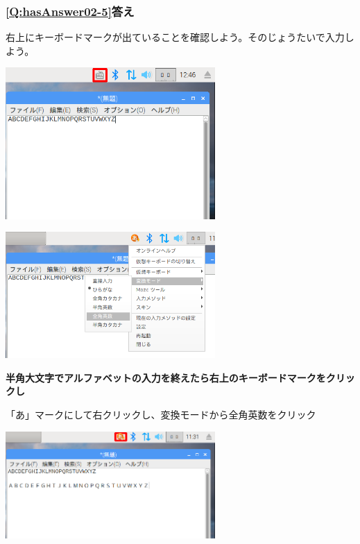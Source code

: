 \documentclass[a4paper,12pt]{jarticle}
\begin{document}
\clearpage\subsubsection{\bfseries
\ref*{Q:hasAnswer02-5}答え}

右上にキーボードマークが出ていることを確認しよう。そのじょうたいで入力しよう。


\bigskip


\centering
\includegraphics[width=0.6\textwidth]{textbook-img218.png}
\flushleft


\bigskip





\centering
\includegraphics[width=0.6\textwidth]{textbook-img219.png}
\flushleft


\bigskip

{\bfseries
  半角大文字でアルファベットの入力を終えたら右上のキーボードマークをクリックし

  「あ」マークにして右クリックし、変換モードから全角英数をクリック}



\bigskip

\bigskip


\centering
\includegraphics[width=0.6\textwidth]{textbook-img220.png}
\flushleft
\end{document}
